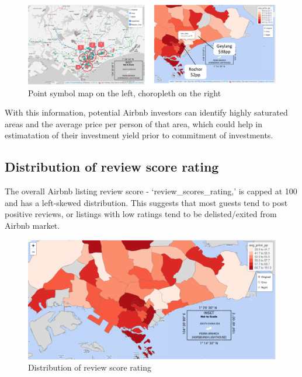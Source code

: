 \documentclass{acm_proc_article-sp}
\begin{document}
\begin{figure}[H]

{\centering \includegraphics[width=1\linewidth]{images/usecase_explore} 

}

\caption{Point symbol map on the left, choropleth on the right}\label{fig:unnamed-chunk-17}
\end{figure}

With this information, potential Airbnb investors can identify highly
saturated areas and the average price per person of that area, which
could help in estimatation of their investment yield prior to commitment
of investments.

\hypertarget{distribution-of-review-score-rating}{%
\subsection{Distribution of review score
rating}\label{distribution-of-review-score-rating}}

The overall Airbnb listing review score - `review\_scores\_rating,' is
capped at 100 and has a left-skewed distribution. This suggests that
most guests tend to post positive reviews, or listings with low ratings
tend to be delisted/exited from Airbnb market.

\begin{figure}[H]

{\centering \includegraphics[width=1\linewidth]{images/usecase_explore2} 

}

\caption{Distribution of review score rating}\label{fig:unnamed-chunk-18}
\end{figure}
\end{document}
